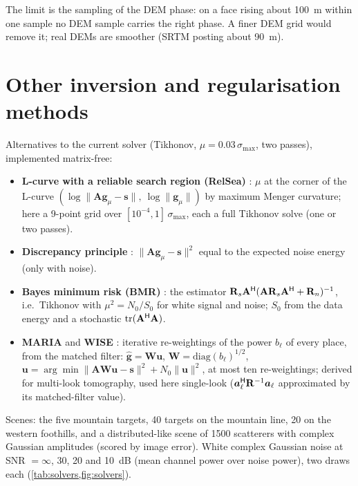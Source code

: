 The limit is the sampling of the DEM phase: on a face rising about \SI{100}{m} within one sample no DEM sample carries the
right phase. A finer DEM grid would remove it; real DEMs are smoother (SRTM posting about \SI{90}{m}).

\section{Other inversion and regularisation methods}\label{sec:solvers}

Alternatives to the current solver (Tikhonov, $\mu=0.03\,\sigma_{\max}$, two passes), implemented matrix-free:
\begin{itemize}
  \item \textbf{L-curve with a reliable search region (RelSea)} \cite{GonzalezCaboverde2026relsea}: $\mu$ at the corner of the L-curve
        $(\log\|\mathbf A\bm g_\mu-\bm s\|,\ \log\|\bm g_\mu\|)$ by maximum Menger curvature; here a 9-point grid over
        $[10^{-4},1]\,\sigma_{\max}$, each a full Tikhonov solve (one or two passes).
  \item \textbf{Discrepancy principle} \cite{Hansen1998}: $\|\mathbf A\bm g_\mu-\bm s\|^2$ equal to the expected noise energy
        (only with noise).
  \item \textbf{Bayes minimum risk (BMR)} \cite{MartinDelCampo2020statreg}: the estimator $\mathbf R_s\mathbf A^{\mathsf{H}}(\mathbf A\mathbf R_s\mathbf A^{\mathsf{H}}+\mathbf R_n)^{-1}$,
        i.e.\ Tikhonov with $\mu^2=N_0/S_0$ for white signal and noise; $S_0$ from the data energy and a stochastic
        $\mathrm{tr}(\mathbf A^{\mathsf{H}}\mathbf A)$.
  \item \textbf{MARIA} \cite{MartinDelCampo2018maria} and \textbf{WISE} \cite{MartinDelCampo2020statreg}: iterative re-weightings
        of the power $b_\ell$ of every place, from the matched filter: $\hat{\bm g}=\mathbf W\bm u$,
        $\mathbf W=\mathrm{diag}(b_\ell)^{1/2}$, $\bm u=\arg\min\|\mathbf A\mathbf W\bm u-\bm s\|^2+N_0\|\bm u\|^2$, at most ten
        re-weightings; derived for multi-look tomography, used here single-look ($\bm a_\ell^{\mathsf{H}}\mathbf R^{-1}\bm a_\ell$
        approximated by its matched-filter value).
\end{itemize}
Scenes: the five mountain targets, 40 targets on the mountain line, 20 on the western foothills, and a distributed-like scene
of 1500 scatterers with complex Gaussian amplitudes (scored by image error). White complex Gaussian noise at SNR $=\infty$, 30, 20
and \SI{10}{dB} (mean channel power over noise power), two draws each (\cref{tab:solvers,fig:solvers}).

